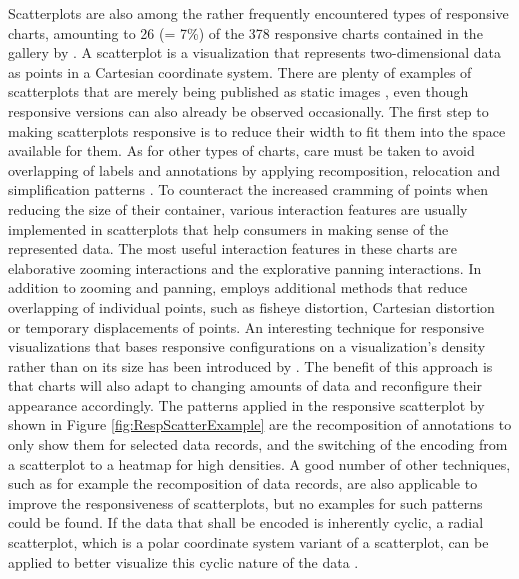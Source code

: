 Scatterplots are also among the rather frequently encountered types of responsive charts, amounting to 26 (= 7\%) of the 378 responsive charts contained in the gallery by \cite{DesignPatternsTradeOffsRespVis}. A scatterplot is a visualization that represents two-dimensional data as points in a Cartesian coordinate system. There are plenty of examples of scatterplots that are merely being published as static images \parencite{Scatter,Scatter2}, even though responsive versions can also already be observed occasionally. The first step to making scatterplots responsive is to reduce their width to fit them into the space available for them. As for other types of charts, care must be taken to avoid overlapping of labels and annotations by applying recomposition, relocation and simplification patterns \parencite{RespScatter,RespScatter2}. To counteract the increased cramming of points when reducing the size of their container, various interaction features are usually implemented in scatterplots that help consumers in making sense of the represented data. The most useful interaction features in these charts are elaborative zooming interactions and the explorative panning interactions. In addition to zooming and panning, \cite{RespVis} employs additional methods that reduce overlapping of individual points, such as fisheye distortion, Cartesian distortion or temporary displacements of points. An interesting technique for responsive visualizations that bases responsive configurations on a visualization's density rather than on its size has been introduced by \cite{NickRabinowitzRDV}. The benefit of this approach is that charts will also adapt to changing amounts of data and reconfigure their appearance accordingly. The patterns applied in the responsive scatterplot by \cite{NickRabinowitzRDV} shown in Figure \ref{fig:RespScatterExample} are the recomposition of annotations to only show them for selected data records, and the switching of the encoding from a scatterplot to a heatmap for high densities. A good number of other techniques, such as for example the recomposition of data records, are also applicable to improve the responsiveness of scatterplots, but no examples for such patterns could be found. If the data that shall be encoded is inherently cyclic, a radial scatterplot, which is a polar coordinate system variant of a scatterplot, can be applied to better visualize this cyclic nature of the data \parencite{RespRadialScatterHLine}. 

